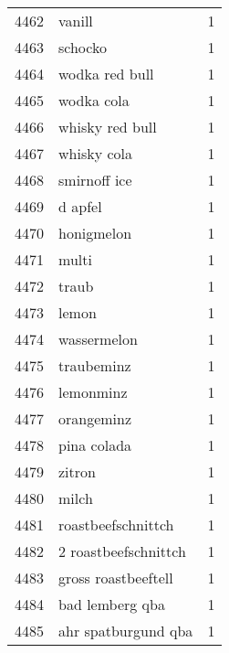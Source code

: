 \begin{tabular}{llr}
4462 &                                             vanill &      1 \\
4463 &                                            schocko &      1 \\
4464 &                                     wodka red bull &      1 \\
4465 &                                         wodka cola &      1 \\
4466 &                                    whisky red bull &      1 \\
4467 &                                        whisky cola &      1 \\
4468 &                                       smirnoff ice &      1 \\
4469 &                                            d apfel &      1 \\
4470 &                                         honigmelon &      1 \\
4471 &                                              multi &      1 \\
4472 &                                              traub &      1 \\
4473 &                                              lemon &      1 \\
4474 &                                        wassermelon &      1 \\
4475 &                                         traubeminz &      1 \\
4476 &                                          lemonminz &      1 \\
4477 &                                         orangeminz &      1 \\
4478 &                                        pina colada &      1 \\
4479 &                                             zitron &      1 \\
4480 &                                              milch &      1 \\
4481 &                                 roastbeefschnittch &      1 \\
4482 &                               2 roastbeefschnittch &      1 \\
4483 &                                gross roastbeeftell &      1 \\
4484 &                                    bad lemberg qba &      1 \\
4485 &                                ahr spatburgund qba &      1 \\

\end{tabular}
